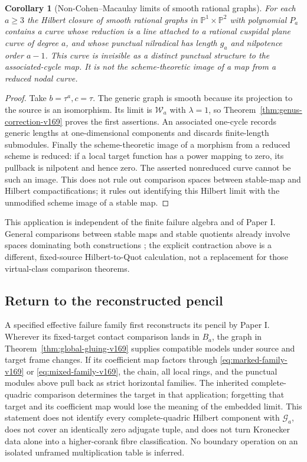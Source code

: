 \documentclass[11pt,reqno]{amsart}
\numberwithin{equation}{section}
\newtheorem{corollary}[theorem]{Corollary}
\theoremstyle{definition}\newtheorem{definition}[theorem]{Definition}
\theoremstyle{remark}\newtheorem{remark}[theorem]{Remark}
\newcommand{\Pj}{\mathbb P}\newcommand{\A}{\mathbb A}
\begin{document}
\begin{corollary}[Non-Cohen--Macaulay limits of smooth rational graphs]
\label{cor:external-curves-v169}
For each $a\geq3$ the Hilbert closure of smooth rational graphs in
$\Pj^1\times\Pj^2$ with polynomial $P_a$ contains a curve whose
reduction is a line attached to a rational cuspidal plane curve of
degree $a$, and whose punctual nilradical has length $g_a$ and
nilpotence order $a-1$. This curve is invisible as a distinct punctual
structure to the associated-cycle map. It is not the scheme-theoretic
image of a map from a reduced nodal curve.
\end{corollary}
\begin{proof}
Take $b=\tau^a,c=\tau$. The generic graph is smooth because its
projection to the source is an isomorphism. Its limit is
$\mathcal W_a$ with $\lambda=1$, so
Theorem~\ref{thm:genus-correction-v169} proves the first assertions.
An associated one-cycle records generic lengths at one-dimensional
components and discards finite-length submodules. Finally the
scheme-theoretic image of a morphism from a reduced scheme is reduced:
if a local target function has a power mapping to zero, its pullback
is nilpotent and hence zero. The asserted nonreduced curve cannot
be such an image. This does not rule out comparison spaces between
stable-map and Hilbert compactifications; it rules out identifying
this Hilbert limit with the unmodified scheme image of a stable map.
\end{proof}
This application is independent of the finite failure algebra and of
Paper I. General comparisons between stable maps and stable quotients
already involve spaces dominating both constructions
\cite{Manolache169}; the explicit contraction above is a different,
fixed-source Hilbert-to-Quot calculation, not a replacement for those
virtual-class comparison theorems.

\subsection{Return to the reconstructed pencil}
A specified effective failure family first reconstructs its pencil by
Paper I. Wherever its fixed-target contact comparison lands in $B_a$,
the graph in Theorem~\ref{thm:global-gluing-v169} supplies compatible
models under source and target frame changes. If its coefficient map
factors through \eqref{eq:marked-family-v169} or
\eqref{eq:mixed-family-v169}, the chain, all local rings, and the
punctual modules above pull back as strict horizontal families.
The inherited complete-quadric comparison determines the target in
that application; forgetting that target and its coefficient map
would lose the meaning of the embedded limit. This statement does
not identify every complete-quadric Hilbert component with
$\mathcal G_a$, does not cover an identically zero adjugate tuple,
and does not turn Kronecker data alone into a higher-corank fibre
classification. No boundary operation on an isolated unframed
multiplication table is inferred.
\end{document}
